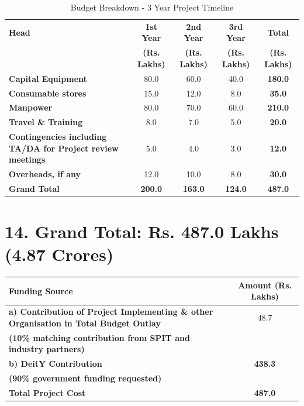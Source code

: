 \documentclass[12pt,a4paper]{article}
\renewcommand{\arraystretch}{1.2}
\begin{document}
\begin{table}[H]
\centering
\caption{Budget Breakdown - 3 Year Project Timeline}
\renewcommand{\arraystretch}{1.4}
\begin{tabular}{|p{3.5cm}|c|c|c|c|}
\hline
\rowcolor{lightblue}
\textbf{Head} & \textbf{1st Year} & \textbf{2nd Year} & \textbf{3rd Year} & \textbf{Total} \\
& \textbf{(Rs. Lakhs)} & \textbf{(Rs. Lakhs)} & \textbf{(Rs. Lakhs)} & \textbf{(Rs. Lakhs)} \\
\hline

\textbf{Capital Equipment} & 80.0 & 60.0 & 40.0 & \textbf{180.0} \\
\hline

\textbf{Consumable stores} & 15.0 & 12.0 & 8.0 & \textbf{35.0} \\
\hline

\textbf{Manpower} & 80.0 & 70.0 & 60.0 & \textbf{210.0} \\
\hline

\textbf{Travel \& Training} & 8.0 & 7.0 & 5.0 & \textbf{20.0} \\
\hline

\textbf{Contingencies including TA/DA for Project review meetings} & 5.0 & 4.0 & 3.0 & \textbf{12.0} \\
\hline

\textbf{Overheads, if any} & 12.0 & 10.0 & 8.0 & \textbf{30.0} \\
\hline

\rowcolor{yellow}
\textbf{Grand Total} & \textbf{200.0} & \textbf{163.0} & \textbf{124.0} & \textbf{487.0} \\
\hline

\end{tabular}
\end{table}

\section*{14. Grand Total: Rs. 487.0 Lakhs (4.87 Crores)}

\begin{table}[H]
\centering
\renewcommand{\arraystretch}{1.4}
\begin{tabular}{|p{8cm}|c|}
\hline
\rowcolor{lightblue}
\textbf{Funding Source} & \textbf{Amount (Rs. Lakhs)} \\
\hline

\textbf{a) Contribution of Project Implementing \& other Organisation in Total Budget Outlay} & 48.7 \\
\textbf{(10\% matching contribution from SPIT and industry partners)} & \\
\hline

\textbf{b) DeitY Contribution} & \textbf{438.3} \\
\textbf{(90\% government funding requested)} & \\
\hline

\rowcolor{yellow}
\textbf{Total Project Cost} & \textbf{487.0} \\
\hline

\end{tabular}
\end{table}
\end{document}
